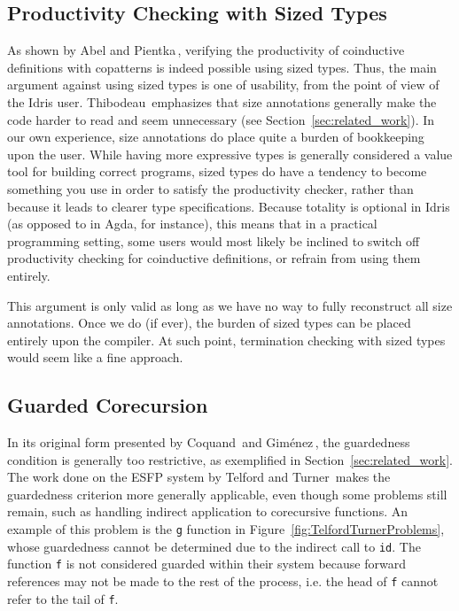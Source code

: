 \subsection{Productivity Checking with Sized Types}
As shown by Abel and Pientka\,\citep{Abel13Wellfounded}, verifying the productivity of coinductive definitions with copatterns is indeed possible using sized types. Thus, the main argument against using sized types is one of usability, from the point of view of the Idris user. Thibodeau\,\citep{Thibodeau11} emphasizes that size annotations generally make the code harder to read and seem unnecessary (see Section~\ref{sec:related_work}). In our own experience, size annotations do place quite a burden of bookkeeping upon the user. While having more expressive types is generally considered a value tool for building correct programs, sized types do have a tendency to become something you use in order to satisfy the productivity checker, rather than because it leads to clearer type specifications. Because totality is optional in Idris (as opposed to in Agda, for instance), this means that in a practical programming setting, some users would most likely be inclined to switch off productivity checking for coinductive definitions, or refrain from using them entirely.

This argument is only valid as long as we have no way to fully reconstruct all size annotations. Once we do (if ever), the burden of sized types can be placed entirely upon the compiler. At such point, termination checking with sized types would seem like a fine approach.

\subsection{Guarded Corecursion}
In its original form presented by Coquand\,\citep{Coquand94} and Gim\'{e}nez\,\citep{Gimenez95}, the guardedness condition is generally too restrictive, as exemplified in Section~\ref{sec:related_work}. The work done on the ESFP system by Telford and Turner\,\citep{Telford97ensuringstreams,Telford98ensuringthe} makes the guardedness criterion more generally applicable, even though some problems still remain, such as handling indirect application to corecursive functions. An example of this problem is the \texttt{g} function in Figure~\ref{fig:TelfordTurnerProblems}, whose guardedness cannot be determined due to the indirect call to \texttt{id}. The function \texttt{f} is not considered guarded within their system because forward references may not be made to the rest of the process, i.e. the head of \texttt{f} cannot refer to the tail of \texttt{f}.

